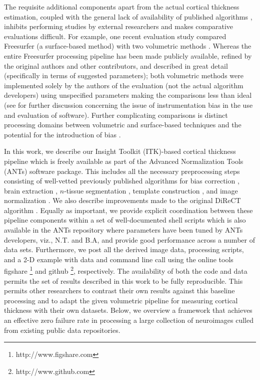   The requisite
additional components apart from the actual cortical thickness estimation, 
coupled with the general lack of availability of published
algorithms \citep{kovacevic2006}, inhibits performing studies by external researchers 
and makes comparative evaluations difficult.  For example, one recent evaluation 
study \citep{clarkson2011} compared
Freesurfer (a surface-based method) with two volumetric methods \citep{jones2000,das2009}.
Whereas the entire Freesurfer processing pipeline has been made publicly available, 
refined by the original authors and other contributors, and described in great detail 
(specifically in terms of suggested parameters); both volumetric methods were 
implemented solely by the authors of the evaluation (not the actual algorithm developers) using 
unspecified parameters making the comparisons less than
ideal (see \cite{tustison2013} for further discussion concerning the issue of instrumentation bias in
the use and evaluation of software). Further complicating comparisons is distinct processing domains between
volumetric and surface-based techniques and the potential for the introduction
of bias \citep{klein2010}.

In this work, we describe our Insight Toolkit (ITK)-based cortical thickness pipeline
which is freely available as part of the Advanced Normalization Tools
(ANTs) software package.  This includes all the necessary preprocessing steps consisting
of well-vetted previously published algorithms for bias correction \citep{tustison2010},
brain extraction \citep{avants2010a}, $n$-tissue segmentation \citep{avants2011a},
template construction \citep{avants2010}, and image normalization \citep{avants2011}.
We also describe improvements made to the original DiReCT algorithm \citep{das2009}.
Equally as important, we provide explicit coordination between
these pipeline components within a set of well-documented shell scripts which 
is also available in the ANTs repository where parameters have been tuned
by ANTs developers, viz., N.T. and B.A,
and provide good performance across a number of data sets.
Furthermore, we post all the derived image data, processing scripts, and a 2-D example with data and command line call 
using the online tools figshare%
\footnote{
http://www.figshare.com
}
 and github%
\footnote{
http://www.github.com
}, respectively.
The
availability of both the code and data permits
the set of results described in this work to be fully reproducible.  This
permits other researchers to contrast their own results against
this baseline processing and to adapt the given volumetric pipeline for measuring
cortical thickness with their own datasets.  Below, we overview a
framework that achieves an effective zero failure
rate in processing a large collection of neuroimages culled from
existing public data repositories. 

